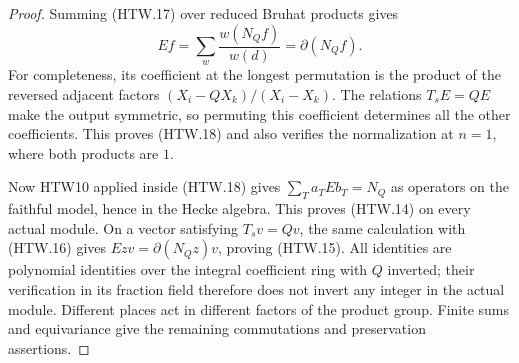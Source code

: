 \documentclass[11pt,a4paper]{article}
\numberwithin{equation}{section}
\theoremstyle{remark}\newtheorem{remark}[theorem]{Remark}
\begin{document}
\begin{proof}
Summing (HTW.17) over reduced Bruhat products gives
\[
 Ef=\sum_w\frac{w(N_Qf)}{w(d)}
                    =\partial(N_Qf).
 \tag{HTW.18}
\]
For completeness, its coefficient at the longest
permutation is the product of the reversed adjacent
factors \((X_i-QX_k)/(X_i-X_k)\).  The relations
\(T_sE=QE\) make the output symmetric, so permuting
this coefficient determines all the other coefficients.
This proves (HTW.18) and also verifies the normalization
at \(n=1\), where both products are \(1\).

Now HTW10 applied inside (HTW.18) gives
\(\sum_Ta_TEb_T=N_Q\) as operators on the faithful
model, hence in the Hecke algebra.  This proves
(HTW.14) on every actual module.  On a vector satisfying
\(T_sv=Qv\), the same calculation with (HTW.16)
gives \(Ezv=\partial(N_Qz)v\), proving (HTW.15).
All identities are polynomial identities over the
integral coefficient ring with \(Q\) inverted;
their verification in its fraction field therefore
does not invert any integer in the actual module.
Different places act in different factors of the
product group.  Finite sums and equivariance give the
remaining commutations and preservation assertions.
\end{proof}

\end{document}
